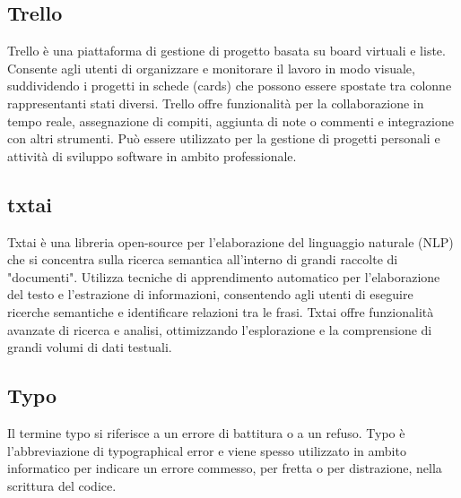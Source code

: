 \vspace{2em}
\subsection*{Trello}
\par Trello è una piattaforma di gestione di progetto basata su board virtuali e liste. Consente agli utenti di organizzare e monitorare il lavoro in modo visuale, suddividendo i progetti in schede (cards) che possono essere spostate tra colonne rappresentanti stati diversi. Trello offre funzionalità per la collaborazione in tempo reale, assegnazione di compiti, aggiunta di note o commenti e integrazione con altri strumenti. Può essere utilizzato per la gestione di progetti personali e attività di sviluppo software in ambito professionale.

\vspace{2em}
\subsection*{txtai}
\par Txtai è una libreria open-source per l'elaborazione del linguaggio naturale (NLP) che si concentra sulla ricerca semantica all'interno di grandi raccolte di "documenti". Utilizza tecniche di apprendimento automatico per l'elaborazione del testo e l'estrazione di informazioni, consentendo agli utenti di eseguire ricerche semantiche e identificare relazioni tra le frasi. Txtai offre funzionalità avanzate di ricerca e analisi, ottimizzando l'esplorazione e la comprensione di grandi volumi di dati testuali.

\vspace{2em}
\subsection*{Typo}
\par Il termine typo si riferisce a un errore di battitura o a un refuso. Typo è l'abbreviazione di typographical error e viene spesso utilizzato in ambito informatico per indicare un errore commesso, per fretta o per distrazione, nella scrittura del codice.
